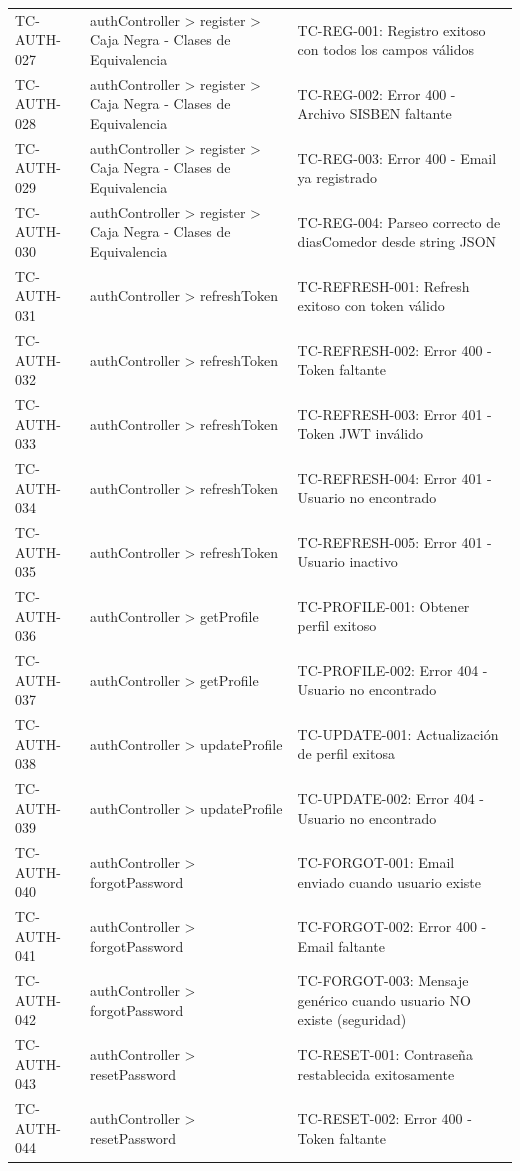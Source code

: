 \begin{longtable}{l L{0.30\textwidth} L{0.40\textwidth}}
TC-AUTH-027 & authController > register > Caja Negra - Clases de Equivalencia & TC-REG-001: Registro exitoso con todos los campos válidos \\
TC-AUTH-028 & authController > register > Caja Negra - Clases de Equivalencia & TC-REG-002: Error 400 - Archivo SISBEN faltante \\
TC-AUTH-029 & authController > register > Caja Negra - Clases de Equivalencia & TC-REG-003: Error 400 - Email ya registrado \\
TC-AUTH-030 & authController > register > Caja Negra - Clases de Equivalencia & TC-REG-004: Parseo correcto de diasComedor desde string JSON \\
TC-AUTH-031 & authController > refreshToken & TC-REFRESH-001: Refresh exitoso con token válido \\
TC-AUTH-032 & authController > refreshToken & TC-REFRESH-002: Error 400 - Token faltante \\
TC-AUTH-033 & authController > refreshToken & TC-REFRESH-003: Error 401 - Token JWT inválido \\
TC-AUTH-034 & authController > refreshToken & TC-REFRESH-004: Error 401 - Usuario no encontrado \\
TC-AUTH-035 & authController > refreshToken & TC-REFRESH-005: Error 401 - Usuario inactivo \\
TC-AUTH-036 & authController > getProfile & TC-PROFILE-001: Obtener perfil exitoso \\
TC-AUTH-037 & authController > getProfile & TC-PROFILE-002: Error 404 - Usuario no encontrado \\
TC-AUTH-038 & authController > updateProfile & TC-UPDATE-001: Actualización de perfil exitosa \\
TC-AUTH-039 & authController > updateProfile & TC-UPDATE-002: Error 404 - Usuario no encontrado \\
TC-AUTH-040 & authController > forgotPassword & TC-FORGOT-001: Email enviado cuando usuario existe \\
TC-AUTH-041 & authController > forgotPassword & TC-FORGOT-002: Error 400 - Email faltante \\
TC-AUTH-042 & authController > forgotPassword & TC-FORGOT-003: Mensaje genérico cuando usuario NO existe (seguridad) \\
TC-AUTH-043 & authController > resetPassword & TC-RESET-001: Contraseña restablecida exitosamente \\
TC-AUTH-044 & authController > resetPassword & TC-RESET-002: Error 400 - Token faltante \\

\end{longtable}
